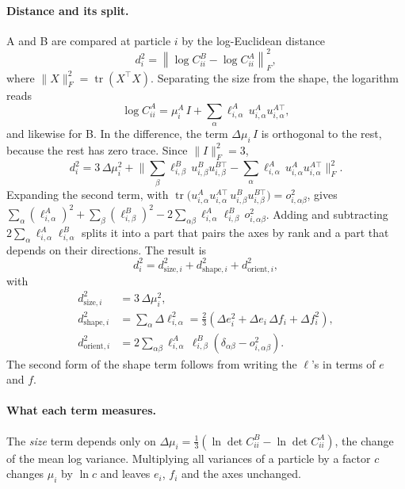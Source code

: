 \documentclass[11pt,a4paper]{article}
\newcommand{\tr}{\operatorname{tr}}
\newcommand{\dsize}{d_{\mathrm{size},i}}
\newcommand{\dshape}{d_{\mathrm{shape},i}}
\newcommand{\dorient}{d_{\mathrm{orient},i}}
\begin{document}
\paragraph{Distance and its split.} A and B are compared at particle $i$ by the log-Euclidean distance~\cite{arsigny2006}
\begin{equation}
d_i^2 = \left\lVert \log C^B_{ii} - \log C^A_{ii}\right\rVert_F^2 ,
\end{equation}
where $\lVert X\rVert_F^2 = \tr(X^\top X)$. Separating the size from the shape, the logarithm reads
\begin{equation}
\log C^A_{ii} = \mu^A_i\, I + \sum_\alpha \ell^A_{i,\alpha}\, u^A_{i,\alpha}u^{A\top}_{i,\alpha} ,
\end{equation}
and likewise for B. In the difference, the term $\Delta\mu_i\, I$ is orthogonal to the rest, because the rest has zero trace. Since $\lVert I\rVert_F^2 = 3$,
\begin{equation}
d_i^2 = 3\,\Delta\mu_i^2 + \Big\lVert \sum_\beta \ell^B_{i,\beta}\, u^B_{i,\beta}u^{B\top}_{i,\beta} - \sum_\alpha \ell^A_{i,\alpha}\, u^A_{i,\alpha}u^{A\top}_{i,\alpha}\Big\rVert_F^2 .
\end{equation}
Expanding the second term, with $\tr\big(u^A_{i,\alpha}u^{A\top}_{i,\alpha}\,u^B_{i,\beta}u^{B\top}_{i,\beta}\big) = o^2_{i,\alpha\beta}$, gives $\sum_\alpha(\ell^A_{i,\alpha})^2 + \sum_\beta(\ell^B_{i,\beta})^2 - 2\sum_{\alpha\beta}\ell^A_{i,\alpha}\ell^B_{i,\beta}\,o^2_{i,\alpha\beta}$. Adding and subtracting $2\sum_\alpha \ell^A_{i,\alpha}\ell^B_{i,\alpha}$ splits it into a part that pairs the axes by rank and a part that depends on their directions. The result is
\begin{equation}
\label{eq:split}
d_i^2 = \dsize^2 + \dshape^2 + \dorient^2,
\end{equation}
with
\begin{align}
\dsize^2 &= 3\,\Delta\mu_i^2 , \label{eq:size}\\
\dshape^2 &= \sum_\alpha \Delta\ell_{i,\alpha}^2 = \tfrac23\left(\Delta e_i^2 + \Delta e_i\,\Delta f_i + \Delta f_i^2\right), \label{eq:shape}\\
\dorient^2 &= 2\sum_{\alpha\beta}\ell^A_{i,\alpha}\,\ell^B_{i,\beta}\left(\delta_{\alpha\beta} - o^2_{i,\alpha\beta}\right). \label{eq:orient}
\end{align}
The second form of the shape term follows from writing the $\ell$'s in terms of $e$ and $f$.

\paragraph{What each term measures.} The \emph{size} term depends only on $\Delta\mu_i = \tfrac13(\ln\det C^B_{ii} - \ln\det C^A_{ii})$, the change of the mean log variance. Multiplying all variances of a particle by a factor $c$ changes $\mu_i$ by $\ln c$ and leaves $e_i$, $f_i$ and the axes unchanged.
\end{document}
